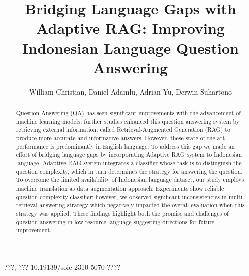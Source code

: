 \documentclass[times]{iapress}
\begin{document}

\title{Bridging Language Gaps with Adaptive RAG: Improving Indonesian Language Question Answering}


\author{William Christian, Daniel Adamlu, Adrian Yu, Derwin Suhartono \corrauth
 }

\address{Computer Science Department, School of Computer Science, Bina Nusantara University, Jakarta 11480, Indonesia}



\begin{abstract}
Question Answering (QA) has seen significant improvements with the advancement of machine learning models, further studies enhanced this question answering system by retrieving external information, called Retrieval-Augmented Generation (RAG) to produce more accurate and informative answers. However, these state-of-the-art-performance is predominantly in English language. To address this gap we made an effort of bridging language gaps by incorporating Adaptive RAG system to Indonesian language. Adaptive RAG system integrates a classifier whose task is to distinguish the question complexity, which in turn determines the strategy for answering the question. To overcome the limited availability of Indonesian language dataset, our study employs machine translation as data augmentation approach. Experiments show reliable question complexity classifier; however, we observed significant inconsistencies in multi-retrieval answering strategy which negatively impacted the overall evaluation when this strategy was applied. These findings highlight both the promise and challenges of question answering in low-resource language suggesting directions for future improvement.
\end{abstract}



\maketitle
{} ???, ???
\vskip 8pt%
 10.19139/soic-2310-5070-????
\end{document}
